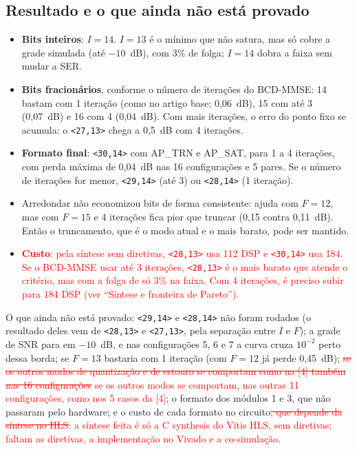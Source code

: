 \documentclass[11pt]{article}
\newcommand{\novo}[1]{\textcolor{red}{#1}}
\newcommand{\velho}[1]{\textcolor{red}{\sout{#1}}}
\begin{document}
\subsection*{Resultado e o que ainda não está provado}

\begin{itemize}
  \item \textbf{Bits inteiros}: $I = 14$. $I = 13$ é o mínimo que não satura, mas só cobre a grade
        simulada (até $-10$~dB), com 3\% de folga; $I = 14$ dobra a faixa sem mudar a SER.
  \item \textbf{Bits fracionários}, conforme o número de iterações do BCD-MMSE: 14 bastam com 1
        iteração (como no artigo base; 0,06~dB), 15 com até 3 (0,07~dB) e 16 com 4 (0,04~dB).
        Com mais iterações, o erro do ponto fixo se acumula: o \texttt{<27,13>} chega a 0,5~dB
        com 4 iterações.
  \item \textbf{Formato final}: \texttt{<30,14>} com AP\_TRN e AP\_SAT, para 1 a 4 iterações, com
        perda máxima de 0,04~dB nas 16 configurações e 5 pares. Se o número de iterações for
        menor, \texttt{<29,14>} (até 3) ou \texttt{<28,14>} (1 iteração).
  \item Arredondar não economizou bits de forma consistente: ajuda com $F = 12$, mas com
        $F = 15$ e 4 iterações fica pior que truncar (0,15 contra 0,11~dB). Então o truncamento,
        que é o modo atual e o mais barato, pode ser mantido.
  \item \novo{\textbf{Custo}: pela síntese sem diretivas, \texttt{<28,13>} usa 112 DSP e
        \texttt{<30,14>} usa 184. Se o BCD-MMSE usar até 3 iterações, \texttt{<28,13>} é o mais
        barato que atende o critério, mas com a folga de só 3\% na faixa. Com 4 iterações, é
        preciso subir para 184 DSP (ver ``Síntese e fronteira de Pareto'').}
\end{itemize}
O que ainda não está provado: \texttt{<29,14>} e \texttt{<28,14>} não foram rodados (o
resultado deles vem de \texttt{<28,13>} e \texttt{<27,13>}, pela separação entre $I$ e $F$); a
grade de SNR para em $-10$~dB, e nas configurações 5, 6 e 7 a curva cruza $10^{-2}$ perto
dessa borda; se $F = 13$ bastaria com 1 iteração (com $F = 12$ já perde
0,45~dB); \velho{se os outros modos de quantização e de estouro se comportam como na [4] também
nas 16 configurações} \novo{se os outros modos se comportam, nas outras 11 configurações, como nos
5 casos da [4]}; o formato dos módulos 1 e 3, que não passaram pelo hardware; e o custo de cada
formato no circuito\velho{, que depende da síntese no HLS}\novo{: a síntese feita é só a C synthesis
do Vitis HLS, sem diretivas; faltam as diretivas, a implementação no Vivado e a co-simulação}.
\end{document}
